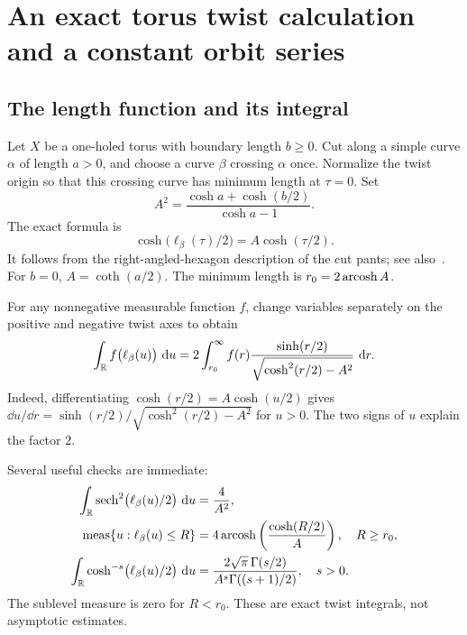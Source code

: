 \section{An exact torus twist calculation and a constant orbit series}
\label{sec:exacttwist}

\subsection{The length function and its integral}

Let $X$ be a one-holed torus with boundary length $b\ge0$. Cut along a
simple curve $\alpha$ of length $a>0$, and choose a curve $\beta$ crossing
$\alpha$ once. Normalize the twist origin so that this crossing curve
has minimum length at $\tau=0$. Set
\begin{equation}
 A^2=\frac{\cosh a+\cosh(b/2)}{\cosh a-1}.
 \label{eq:Atwist}
\end{equation}
The exact formula is
\begin{equation}
 \boxed{\cosh\bigl(\ell_\beta(\tau)/2\bigr)=A\cosh(\tau/2).}
 \label{eq:torustwist}
\end{equation}
It follows from the right-angled-hexagon description of the cut pants;
see also~\cite[Proposition 3.1]{ALPS}. For $b=0$,
$A=\coth(a/2)$. The minimum length is $r_0=2\operatorname{arcosh} A$.

For any nonnegative measurable function $f$, change variables separately
on the positive and negative twist axes to obtain
\begin{equation}
 \int_{\mathbb R}f\bigl(\ell_\beta(u)\bigr)\,\mathop{}\!\mathrm d u
 =2\int_{r_0}^\infty
 f(r)\frac{\sinh(r/2)}{\sqrt{\cosh^2(r/2)-A^2}}\,\mathop{}\!\mathrm d r.
 \label{eq:toruscoarea}
\end{equation}
Indeed, differentiating $\cosh(r/2)=A\cosh(u/2)$ gives
$\dd u/\dd r=\sinh(r/2)/\sqrt{\cosh^2(r/2)-A^2}$ for $u>0$.
The two signs of $u$ explain the factor $2$.

Several useful checks are immediate:
\begin{align}
 \int_{\mathbb R}\operatorname{sech}^2\bigl(\ell_\beta(u)/2\bigr)\,\mathop{}\!\mathrm d u
     &=\frac4{A^2},\label{eq:sechintegral}\\
 \operatorname{meas}\{u:\ell_\beta(u)\le R\}
     &=4\operatorname{arcosh}\left(\frac{\cosh(R/2)}{A}\right),\quad R\ge r_0,
       \label{eq:sublevel}\\
 \int_{\mathbb R}\cosh^{-s}\bigl(\ell_\beta(u)/2\bigr)\,\mathop{}\!\mathrm d u
     &=\frac{2\sqrt\pi\,\Gamma(s/2)}
             {A^s\Gamma((s+1)/2)},\quad s>0.
       \label{eq:betaintegral}
\end{align}
The sublevel measure is zero for $R<r_0$. These are exact twist integrals,
not asymptotic estimates.

